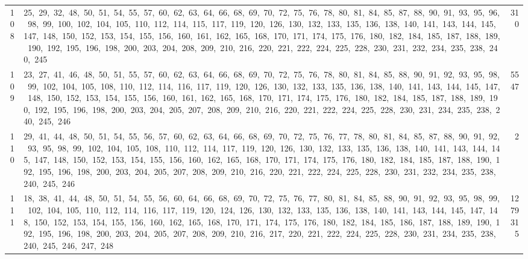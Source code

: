 \begin{longtable}{c|p{}|r}
108 & 25,\ 29,\ 32,\ 48,\ 50,\ 51,\ 54,\ 55,\ 57,\ 60,\ 62,\ 63,\ 64,\ 66,\ 68,\ 69,\ 70,\ 72,\ 75,\ 76,\ 78,\ 80,\ 81,\ 84,\ 85,\ 87,\ 88,\ 90,\ 91,\ 93,\ 95,\ 96,\ 98,\ 99,\ 100,\ 102,\ 104,\ 105,\ 110,\ 112,\ 114,\ 115,\ 117,\ 119,\ 120,\ 126,\ 130,\ 132,\ 133,\ 135,\ 136,\ 138,\ 140,\ 141,\ 143,\ 144,\ 145,\ 147,\ 148,\ 150,\ 152,\ 153,\ 154,\ 155,\ 156,\ 160,\ 161,\ 162,\ 165,\ 168,\ 170,\ 171,\ 174,\ 175,\ 176,\ 180,\ 182,\ 184,\ 185,\ 187,\ 188,\ 189,\ 190,\ 192,\ 195,\ 196,\ 198,\ 200,\ 203,\ 204,\ 208,\ 209,\ 210,\ 216,\ 220,\ 221,\ 222,\ 224,\ 225,\ 228,\ 230,\ 231,\ 232,\ 234,\ 235,\ 238,\ 240,\ 245 & 310 \\
109 & 23,\ 27,\ 41,\ 46,\ 48,\ 50,\ 51,\ 55,\ 57,\ 60,\ 62,\ 63,\ 64,\ 66,\ 68,\ 69,\ 70,\ 72,\ 75,\ 76,\ 78,\ 80,\ 81,\ 84,\ 85,\ 88,\ 90,\ 91,\ 92,\ 93,\ 95,\ 98,\ 99,\ 102,\ 104,\ 105,\ 108,\ 110,\ 112,\ 114,\ 116,\ 117,\ 119,\ 120,\ 126,\ 130,\ 132,\ 133,\ 135,\ 136,\ 138,\ 140,\ 141,\ 143,\ 144,\ 145,\ 147,\ 148,\ 150,\ 152,\ 153,\ 154,\ 155,\ 156,\ 160,\ 161,\ 162,\ 165,\ 168,\ 170,\ 171,\ 174,\ 175,\ 176,\ 180,\ 182,\ 184,\ 185,\ 187,\ 188,\ 189,\ 190,\ 192,\ 195,\ 196,\ 198,\ 200,\ 203,\ 204,\ 205,\ 207,\ 208,\ 209,\ 210,\ 216,\ 220,\ 221,\ 222,\ 224,\ 225,\ 228,\ 230,\ 231,\ 234,\ 235,\ 238,\ 240,\ 245,\ 246 & 5547 \\
110 & 29,\ 41,\ 44,\ 48,\ 50,\ 51,\ 54,\ 55,\ 56,\ 57,\ 60,\ 62,\ 63,\ 64,\ 66,\ 68,\ 69,\ 70,\ 72,\ 75,\ 76,\ 77,\ 78,\ 80,\ 81,\ 84,\ 85,\ 87,\ 88,\ 90,\ 91,\ 92,\ 93,\ 95,\ 98,\ 99,\ 102,\ 104,\ 105,\ 108,\ 110,\ 112,\ 114,\ 117,\ 119,\ 120,\ 126,\ 130,\ 132,\ 133,\ 135,\ 136,\ 138,\ 140,\ 141,\ 143,\ 144,\ 145,\ 147,\ 148,\ 150,\ 152,\ 153,\ 154,\ 155,\ 156,\ 160,\ 162,\ 165,\ 168,\ 170,\ 171,\ 174,\ 175,\ 176,\ 180,\ 182,\ 184,\ 185,\ 187,\ 188,\ 190,\ 192,\ 195,\ 196,\ 198,\ 200,\ 203,\ 204,\ 205,\ 207,\ 208,\ 209,\ 210,\ 216,\ 220,\ 221,\ 222,\ 224,\ 225,\ 228,\ 230,\ 231,\ 232,\ 234,\ 235,\ 238,\ 240,\ 245,\ 246 & 2 \\
111 & 18,\ 38,\ 41,\ 44,\ 48,\ 50,\ 51,\ 54,\ 55,\ 56,\ 60,\ 64,\ 66,\ 68,\ 69,\ 70,\ 72,\ 75,\ 76,\ 77,\ 80,\ 81,\ 84,\ 85,\ 88,\ 90,\ 91,\ 92,\ 93,\ 95,\ 98,\ 99,\ 102,\ 104,\ 105,\ 110,\ 112,\ 114,\ 116,\ 117,\ 119,\ 120,\ 124,\ 126,\ 130,\ 132,\ 133,\ 135,\ 136,\ 138,\ 140,\ 141,\ 143,\ 144,\ 145,\ 147,\ 148,\ 150,\ 152,\ 153,\ 154,\ 155,\ 156,\ 160,\ 162,\ 165,\ 168,\ 170,\ 171,\ 174,\ 175,\ 176,\ 180,\ 182,\ 184,\ 185,\ 186,\ 187,\ 188,\ 189,\ 190,\ 192,\ 195,\ 196,\ 198,\ 200,\ 203,\ 204,\ 205,\ 207,\ 208,\ 209,\ 210,\ 216,\ 217,\ 220,\ 221,\ 222,\ 224,\ 225,\ 228,\ 230,\ 231,\ 234,\ 235,\ 238,\ 240,\ 245,\ 246,\ 247,\ 248 & 1279315 \\

\end{longtable}
